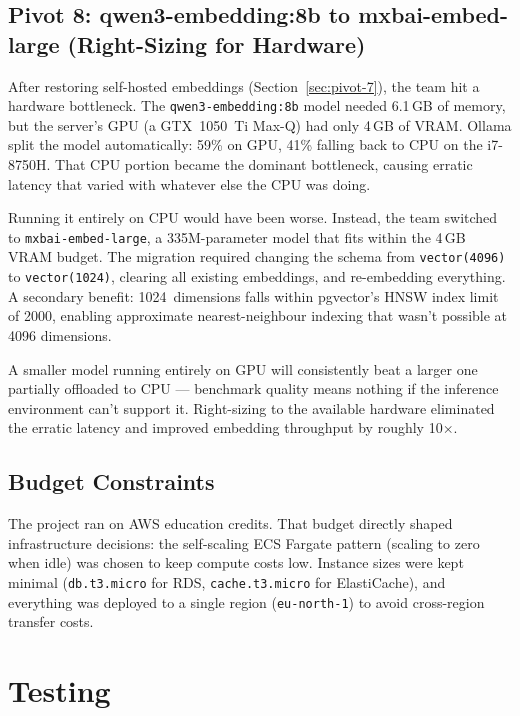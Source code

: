 \documentclass[12pt,a4paper]{article}
\newcommand{\tech}[1]{\texttt{#1}}
\begin{document}
\subsection{Pivot 8: qwen3-embedding:8b to mxbai-embed-large (Right-Sizing for Hardware)}
\label{sec:pivot-8}

After restoring self-hosted embeddings (Section~\ref{sec:pivot-7}), the team hit a hardware bottleneck. The \tech{qwen3-embedding:8b} model needed 6.1\,GB of memory, but the server's GPU (a GTX~1050~Ti Max-Q) had only 4\,GB of VRAM. Ollama split the model automatically: 59\% on GPU, 41\% falling back to CPU on the i7-8750H. That CPU portion became the dominant bottleneck, causing erratic latency that varied with whatever else the CPU was doing.

Running it entirely on CPU would have been worse. Instead, the team switched to \tech{mxbai-embed-large}, a 335M-parameter model that fits within the 4\,GB VRAM budget. The migration required changing the schema from \tech{vector(4096)} to \tech{vector(1024)}, clearing all existing embeddings, and re-embedding everything. A secondary benefit: 1024~dimensions falls within pgvector's HNSW index limit of 2000, enabling approximate nearest-neighbour indexing that wasn't possible at 4096 dimensions.

A smaller model running entirely on GPU will consistently beat a larger one partially offloaded to CPU --- benchmark quality means nothing if the inference environment can't support it. Right-sizing to the available hardware eliminated the erratic latency and improved embedding throughput by roughly 10$\times$.

\subsection{Budget Constraints}
\label{sec:budget}

The project ran on AWS education credits. That budget directly shaped infrastructure decisions: the self-scaling ECS Fargate pattern (scaling to zero when idle) was chosen to keep compute costs low. Instance sizes were kept minimal (\tech{db.t3.micro} for RDS, \tech{cache.t3.micro} for ElastiCache), and everything was deployed to a single region (\tech{eu-north-1}) to avoid cross-region transfer costs.


\section{Testing}
\label{sec:testing}
\end{document}
